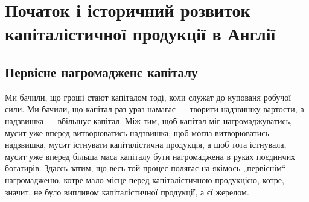 
\setcounter{chapter}{23}
\section[Початок і історичний розвиток
капіталістичної продукції в Англії]{Початок і історичний розвиток капіталістичної продукції в Англії\footnotemarkZ{}}


\subsection{Первісне нагромадженє капіталу}

Ми бачили, що гроші стают капіталом тоді, коли служат
до купованя робучої сили. Ми бачили, що капітал
раз-ураз намагає — творити надзвишку вартости, а надзвишка —
вбільшує капітал. Між тим, щоб капітал міг нагромаджуватись,
мусит уже вперед витворюватись надзвишка;
щоб могла витворюватись надзвишка, мусит істнувати капіталістична
продукція, а щоб тота істнувала, мусит уже
вперед більша маса капіталу бути нагромаджена в руках
поєдинчих богатирів. Здаєсь затим, що весь той процес
полягає на якімось „первіснім“ нагромадженю, котре мало
місце перед капіталістичною продукцією, котре, значит, не
було випливом капіталістичної продукції, а єї жерелом.

